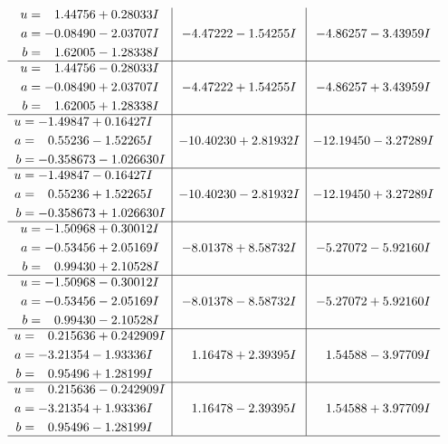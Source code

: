 \documentclass[1p]{elsarticle_modified}
\theoremstyle{definition}
\begin{document}
$$\begin{array}{c|c|c}
\begin{aligned}
u &= \phantom{-}1.44756 + 0.28033 I \\
a &= -0.08490 - 2.03707 I \\
b &= \phantom{-}1.62005 - 1.28338 I\end{aligned}
 & -4.47222 - 1.54255 I & -4.86257 - 3.43959 I \\ \hline\begin{aligned}
u &= \phantom{-}1.44756 - 0.28033 I \\
a &= -0.08490 + 2.03707 I \\
b &= \phantom{-}1.62005 + 1.28338 I\end{aligned}
 & -4.47222 + 1.54255 I & -4.86257 + 3.43959 I \\ \hline\begin{aligned}
u &= -1.49847 + 0.16427 I \\
a &= \phantom{-}0.55236 - 1.52265 I \\
b &= -0.358673 - 1.026630 I\end{aligned}
 & -10.40230 + 2.81932 I & -12.19450 - 3.27289 I \\ \hline\begin{aligned}
u &= -1.49847 - 0.16427 I \\
a &= \phantom{-}0.55236 + 1.52265 I \\
b &= -0.358673 + 1.026630 I\end{aligned}
 & -10.40230 - 2.81932 I & -12.19450 + 3.27289 I \\ \hline\begin{aligned}
u &= -1.50968 + 0.30012 I \\
a &= -0.53456 + 2.05169 I \\
b &= \phantom{-}0.99430 + 2.10528 I\end{aligned}
 & -8.01378 + 8.58732 I & -5.27072 - 5.92160 I \\ \hline\begin{aligned}
u &= -1.50968 - 0.30012 I \\
a &= -0.53456 - 2.05169 I \\
b &= \phantom{-}0.99430 - 2.10528 I\end{aligned}
 & -8.01378 - 8.58732 I & -5.27072 + 5.92160 I \\ \hline\begin{aligned}
u &= \phantom{-}0.215636 + 0.242909 I \\
a &= -3.21354 - 1.93336 I \\
b &= \phantom{-}0.95496 + 1.28199 I\end{aligned}
 & \phantom{-}1.16478 + 2.39395 I & \phantom{-}1.54588 - 3.97709 I \\ \hline\begin{aligned}
u &= \phantom{-}0.215636 - 0.242909 I \\
a &= -3.21354 + 1.93336 I \\
b &= \phantom{-}0.95496 - 1.28199 I\end{aligned}
 & \phantom{-}1.16478 - 2.39395 I & \phantom{-}1.54588 + 3.97709 I\\
 \hline 
 \end{array}$$\newpage\newpage\renewcommand{\arraystretch}{1}
\end{document}
